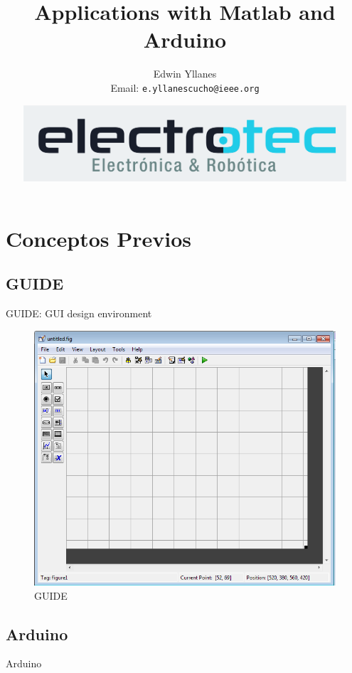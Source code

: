 \documentclass[fleqn,xcolor=dvipsnames,8pt]{beamer} %
\begin{document}
\title{Applications with Matlab and Arduino}
\author[Edwin Yllanes]{{\large Edwin Yllanes}\\ Email: \texttt{e.yllanescucho@ieee.org}}
\date{\includegraphics[width=0.9\textwidth]{images/logo.jpg}}
\begin{frame}
\titlepage
\end{frame}
\begin{frame}
\tableofcontents
\end{frame}
\section{Conceptos Previos}
\subsection{GUIDE}
\begin{frame}{GUIDE: GUI design environment}
\begin{figure}
\centering
\includegraphics[height=0.6\textheight]{images/guide.png}
\caption{GUIDE}
\end{figure}
\end{frame}
\subsection{Arduino}
\begin{frame}{Arduino}
\end{frame}
\end{document}
